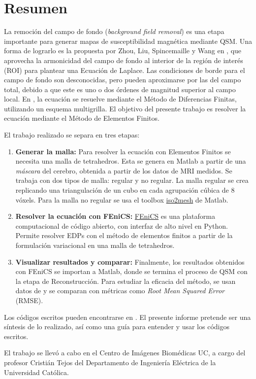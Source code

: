 \newpage
\section{Resumen}

La remoción del campo de fondo (\textit{background field removal}) es una etapa importante para generar mapas de susceptibilidad magnética mediante QSM. Una forma de lograrlo es la propuesta por Zhou, Liu, Spincemaille y Wang en \cite{lbv_fmg}, que aprovecha la armonicidad del campo de fondo al interior de la región de interés (ROI) para plantear una Ecuación de Laplace. Las condiciones de borde para el campo de fondo son desconocidas, pero pueden aproximarse por las del campo total, debido a que este es uno o dos órdenes de magnitud superior al campo local. En \cite{lbv_fmg}, la ecuación se resuelve mediante el Método de Diferencias Finitas, utilizando un esquema multigrilla. El objetivo del presente trabajo es resolver la ecuación mediante el Método de Elementos Finitos.

El trabajo realizado se separa en tres etapas:

\begin{enumerate}
    \item \textbf{Generar la malla:} Para resolver la ecuación con Elementos Finitos se necesita una malla de tetrahedros. Esta se genera en Matlab a partir de una \textit{máscara} del cerebro, obtenida a partir de los datos de MRI medidos. Se trabaja con dos tipos de malla: regular y no regular. La malla regular se crea replicando una triangulación de un cubo en cada agrupación cúbica de 8 vóxels. Para la malla no regular se usa el toolbox \href{http://iso2mesh.sourceforge.net/cgi-bin/index.cgi}{iso2mesh} de Matlab.
    \item \textbf{Resolver la ecuación con FEniCS:} \href{https://fenicsproject.org}{FEniCS} es una plataforma computacional de código abierto, con interfaz de alto nivel en Python. Permite resolver EDPs con el método de elementos finitos a partir de la formulación variacional en una malla de tetrahedros.
    \item \textbf{Visualizar resultados y comparar:} Finalmente, los resultados obtenidos con FEniCS se importan a Matlab, donde se termina el proceso de QSM con la etapa de Reconstrucción. Para estudiar la eficacia del método, se usan datos de \cite{challenge} y se comparan con métricas como \textit{Root Mean Squared Error} (RMSE).
\end{enumerate}

Los códigos escritos pueden encontrarse en \cite{github}. El presente informe pretende ser una síntesis de lo realizado, así como una guía para entender y usar los códigos escritos.


El trabajo se llevó a cabo en el Centro de Imágenes Biomédicas UC, a cargo del profesor Cristián Tejos del Departamento de Ingeniería Eléctrica de la Universidad Católica.

